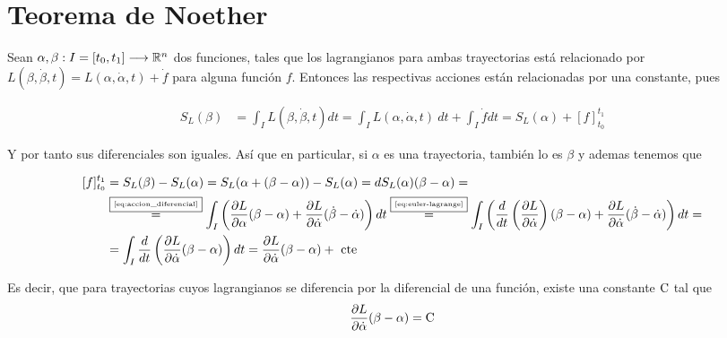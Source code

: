 \section{Teorema de Noether}

Sean $\alpha,\beta:I=[t_0, t_1]\longrightarrow \mathbb{R}^n$ dos funciones, tales que los lagrangianos para ambas trayectorias está relacionado por $L(\beta, \dot{\beta}, t) = L(\alpha, \dot{\alpha}, t)+\dot{f}$ para alguna función $f$.
Entonces las respectivas acciones están relacionadas por una constante, pues

\begin{equation}
    \label{eq:variacion-accion}
    \begin{split}
        S_L(\beta) & = \int_I L(\beta, \dot{\beta}, t) dt = \int_I L(\alpha, \dot{\alpha}, t)\ dt+\int_I \dot{f}dt=S_L(\alpha) +[f]_{t_0}^{t_1}
    \end{split}
\end{equation}

Y por tanto sus diferenciales son iguales.
Así que en particular, si $\alpha$ es una trayectoria, también lo es $\beta$ y ademas tenemos que

\begin{equation}
    \label{eq:diferencial_trayectoria}
    \begin{split}
    [f]
        _{t_0}^{t_1} &= S_L(\beta) - S_L(\alpha) = S_L(\alpha + (\beta-\alpha))-S_L(\alpha)=dS_L(\alpha)(\beta-\alpha)=\\
        &\overset{\fbox{\tiny \ref{eq:accion_diferencial}}}{=}\int_{I}\left( \frac{\partial L}{\partial\alpha}(\beta-\alpha)+\frac{\partial L}{\partial\dot{\alpha}}(\dot{\beta}-\dot{\alpha})\right) dt\overset{\fbox{\tiny \ref{eq:euler-lagrange}}}{=}\int_{I}\left( \frac{d}{dt}\left(\frac{\partial L}{\partial\dot{\alpha}}\right)(\beta-\alpha)+\frac{\partial L}{\partial\dot{\alpha}}(\dot{\beta}-\dot{\alpha})\right) dt=\\
        &=\int_{I}\frac{d}{dt}\left(\frac{\partial L}{\partial\dot{\alpha}}(\beta-\alpha)\right) dt = \frac{\partial L}{\partial\dot{\alpha}}(\beta-\alpha) + \text{ cte }
    \end{split}
\end{equation}

Es decir, que para trayectorias cuyos lagrangianos se diferencia por la diferencial de una función, existe una constante $\text{\rmfamily\upshape C}$ tal que
\begin{equation}
    \label{eq:flujo_noether_para_trayectorias}
    \frac{\partial L}{\partial\dot{\alpha}}(\beta-\alpha) = \text{\rmfamily\upshape C}
\end{equation}

